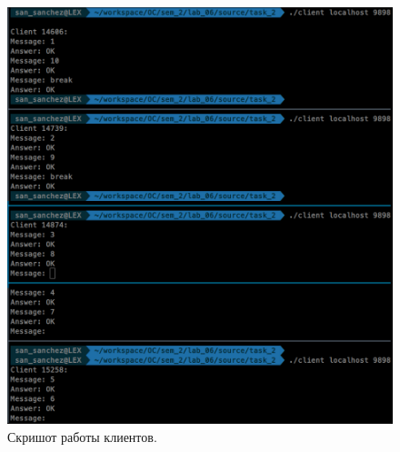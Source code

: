 \begin{figure}[H]
    \centering
    \includegraphics[scale=0.4]{data/image/clietns_1.png}
    \caption{Скришот работы клиентов.}
\end{figure}
